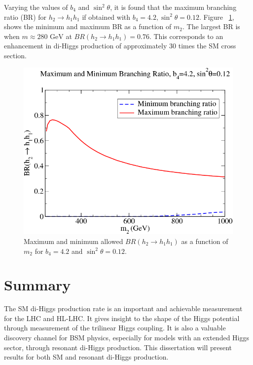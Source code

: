 \indent Varying the values of ${b_{4}}$ and ${\sin^{2}{\theta}}$, it is found that the maximum branching ratio (BR) for ${h_{2}\rightarrow h_{1}h_{1}}$ if obtained with ${b_{4} = 4.2, \sin^{2}\theta = 0.12}$. Figure ~\ref{fig:Ian6}, shows the minimum and maximum BR as a function of ${m_{2}}$. The largest BR is when ${m \approx 280 \text{ GeV}}$ at ${BR(h_{2}\rightarrow h_{1}h_{1}) = 0.76}$. This corresponds to an enhancement in di-Higgs production of approximately 30 times the SM cross section.

\begin{figure}[h]
\begin{center}
\includegraphics[scale=0.5]{figures/Ian6}
\caption[Allowed branching ratios for resonant di-Higgs production]{Maximum and minimum allowed ${BR(h_{2}\rightarrow h_{1}h_{1})}$ as a function of ${m_{2}}$ for ${b_{4} = 4.2}$ and ${\sin^{2}{\theta} = 0.12}$.}
\label{fig:Ian6}
\end{center}
\end{figure}

\section{Summary}
The SM di-Higgs production rate is an important and achievable measurement for the LHC and HL-LHC. It gives insight to the shape of the Higgs potential through measurement of the trilinear Higgs coupling. It is also a valuable discovery channel for BSM physics, especially for models with an extended Higgs sector, through resonant di-Higgs production. This dissertation will present results for both SM and resonant di-Higgs production.